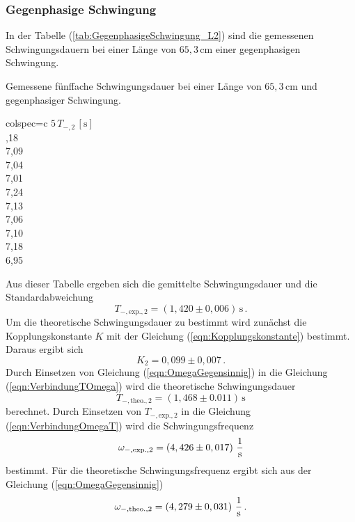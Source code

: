 \subsubsection{Gegenphasige Schwingung}
\label{sec:GegenphasigeSchwingung_LangesPendel}
In der Tabelle (\ref{tab:GegenphasigeSchwingung_L2}) sind die gemessenen Schwingungsdauern bei einer Länge von $65,3\, \unit{\centi\meter}$ einer gegenphasigen
Schwingung. 
\begin{table}[H]
  \centering
  \caption{Gemessene fünffache Schwingungsdauer bei einer Länge von $65,3\, \unit{\centi\meter}$ und gegenphasiger Schwingung.}
  \label{tab:GegenphasigeSchwingung_L2}
  \begin{tblr}{colspec={c}}
      \toprule
      $5\, T_{-, 2}\,\left[\unit{\second}\right]$\\
      ,18 \\
      7,09 \\
      7,04 \\
      7,01 \\
      7,24 \\
      7,13 \\
      7,06 \\
      7,10 \\
      7,18 \\
      6,95 \\
      \bottomrule
  \end{tblr}
\end{table}
Aus dieser Tabelle ergeben sich die gemittelte Schwingungsdauer und die Standardabweichung
$$T_{-,\text{exp.},2} = \left(1,420 \pm 0,006\right)\,\unit{\second}\,.$$
Um die theoretische Schwingungsdauer zu bestimmt wird zunächst die Kopplungskonstante $K$ mit der
Gleichung (\ref{eqn:Kopplungskonstante}) bestimmt. Daraus ergibt sich
$$K_{2} = 0,099 \pm 0,007\,.$$
Durch Einsetzen von Gleichung (\ref{eqn:OmegaGegensinnig}) in die Gleichung (\ref{eqn:VerbindungTOmega}) wird die theoretische Schwingungsdauer 
$$T_{-,\text{theo.},2} = \left( 1,468 \pm 0.011 \right)\,\unit{\second}$$ berechnet. Durch Einsetzen von
$T_{-,\text{exp.},2}$ in die Gleichung (\ref{eqn:VerbindungOmegaT}) wird die Schwingungsfrequenz 
$$\omega_{-,\text{exp.},2} = \left(4,426 \pm 0,017 \right)\, \unit[per-mode=fraction]{\per\second}$$ bestimmt. 
Für die theoretische Schwingungsfrequenz ergibt sich aus der Gleichung (\ref{eqn:OmegaGegensinnig}) 
$$\omega_{-,\text{theo.},2} = \left( 4,279 \pm 0,031 \right)\, \unit[per-mode=fraction]{\per\second}\,.$$
%
%
